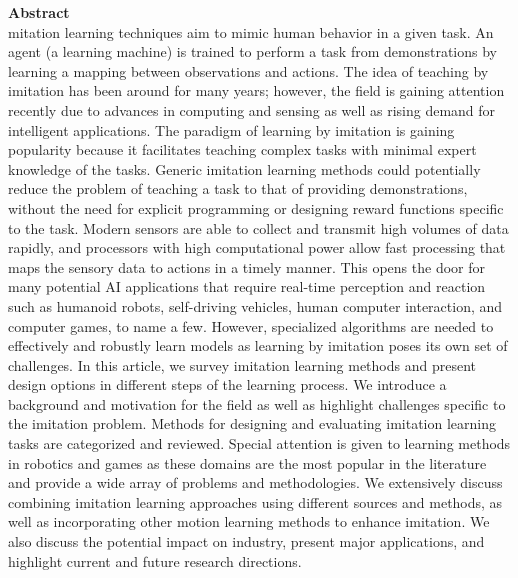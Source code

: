 \documentclass[report.tex]{subfiles}
\begin{document}
\noindent\textbf{Abstract} \\
mitation learning techniques aim to mimic human behavior in a given task. An agent (a learning machine) is trained to perform a task from demonstrations by learning a mapping between observations and actions. The idea of teaching by imitation has been around for many years; however, the field is gaining attention recently due to advances in computing and sensing as well as rising demand for intelligent applications. The paradigm of learning by imitation is gaining popularity because it facilitates teaching complex tasks with minimal expert knowledge of the tasks. Generic imitation learning methods could potentially reduce the problem of teaching a task to that of providing demonstrations, without the need for explicit programming or designing reward functions specific to the task. Modern sensors are able to collect and transmit high volumes of data rapidly, and processors with high computational power allow fast processing that maps the sensory data to actions in a timely manner. This opens the door for many potential AI applications that require real-time perception and reaction such as humanoid robots, self-driving vehicles, human computer interaction, and computer games, to name a few. However, specialized algorithms are needed to effectively and robustly learn models as learning by imitation poses its own set of challenges. In this article, we survey imitation learning methods and present design options in different steps of the learning process. We introduce a background and motivation for the field as well as highlight challenges specific to the imitation problem. Methods for designing and evaluating imitation learning tasks are categorized and reviewed. Special attention is given to learning methods in robotics and games as these domains are the most popular in the literature and provide a wide array of problems and methodologies. We extensively discuss combining imitation learning approaches using different sources and methods, as well as incorporating other motion learning methods to enhance imitation. We also discuss the potential impact on industry, present major applications, and highlight current and future research directions.
\\
\end{document}
